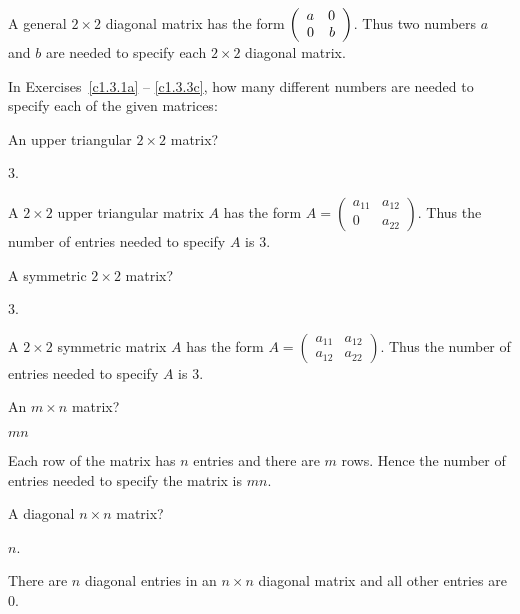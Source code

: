 \documentclass{ximera}
\begin{document}
\noindent A general $2\times 2$ diagonal matrix has the form
$\left(\begin{array}{rr} a & 0\\ 0 &b\end{array}\right)$.  Thus two numbers $a$ and $b$ are
needed to specify each $2\times 2$ diagonal matrix.  

In Exercises~\ref{c1.3.1a} -- \ref{c1.3.3c}, how many different numbers
are needed to specify each of the given matrices:
\begin{exercise}  \label{c1.3.1a}
An upper triangular $2\times 2$ matrix?

\begin{solution}
\ans $3$.

\soln A $2\times 2$ upper triangular matrix $A$ has the form $A = \left( \begin{array}{cc}
            a_{11} & a_{12} \\
            0 & a_{22} \end{array} \right)$.  Thus the number of entries needed to specify $A$ is $3$.  

\end{solution}
\end{exercise}

\begin{exercise}  \label{c1.3.1b}
A symmetric $2\times 2$ matrix?

\begin{solution}
\ans $3$.

\soln  A $2\times 2$ symmetric matrix $A$ has the form $A = \left( \begin{array}{cc}
            a_{11} & a_{12} \\
            a_{12} & a_{22} \end{array} \right)$.  Thus the number of entries needed to specify $A$ is $3$.  

\end{solution}
\end{exercise}

\begin{exercise}  \label{c1.3.2}
An $m\times n$ matrix?

\begin{solution}
\ans $mn$

\soln Each row of the matrix has $n$ entries and there are $m$ rows.  Hence the number of entries needed to specify the matrix is $mn$.

\end{solution}
\end{exercise}

\begin{exercise}  \label{c1.3.3a}
A diagonal $n\times n$ matrix? 

\begin{solution}
\ans $n$.

\soln There are $n$ diagonal entries in an $n\times n$ diagonal matrix and all other entries are $0$.
\end{solution}
\end{exercise}
\end{document}
